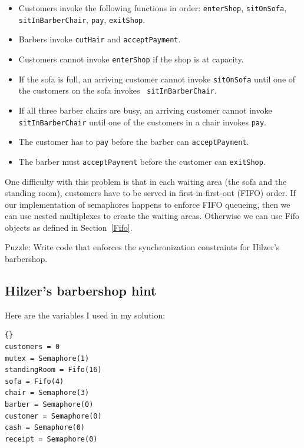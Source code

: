 \documentclass{book}
\begin{document}
\begin{itemize}

\item Customers invoke the following functions in order:
{\tt enterShop}, {\tt sitOnSofa},
{\tt sitInBarberChair}, {\tt pay},
{\tt exitShop}.

\item Barbers invoke {\tt cutHair} and {\tt acceptPayment}.

\item Customers cannot invoke {\tt enterShop} if the shop
is at capacity.

\item If the sofa is full, an arriving customer cannot invoke 
{\tt sitOnSofa} until one of the customers on the sofa invokes {\tt
sitInBarberChair}.

\item If all three barber chairs are busy, an arriving customer
cannot invoke {\tt sitInBarberChair} until one of the customers in a
chair invokes {\tt pay}.

\item The customer has to {\tt pay} before the barber can
{\tt acceptPayment}.

\item The barber must {\tt acceptPayment} before the customer can
{\tt exitShop}.

\end{itemize}

One difficulty with this problem is that in each waiting area (the
sofa and the standing room), customers have to be served in
first-in-first-out (FIFO) order.  If our implementation of semaphores
happens to enforce FIFO queueing, then we can use nested multiplexes
to create the waiting areas.  Otherwise we can use Fifo objects
as defined in Section~\ref{Fifo}.

Puzzle: Write code that enforces the synchronization
constraints for Hilzer's barbershop.


\subsection {Hilzer's barbershop hint}

Here are the variables I used in my solution:

\begin{lstlisting}[caption={Hilzer's barbershop hint}]{}
customers = 0
mutex = Semaphore(1)
standingRoom = Fifo(16)
sofa = Fifo(4)
chair = Semaphore(3)
barber = Semaphore(0)
customer = Semaphore(0)
cash = Semaphore(0)
receipt = Semaphore(0)
\end{lstlisting}
\end{document}
